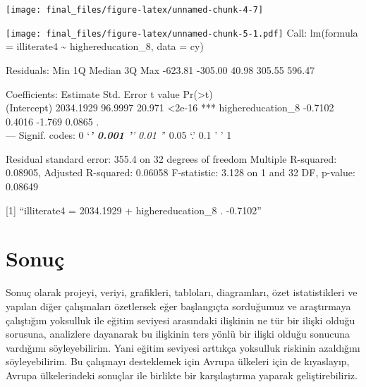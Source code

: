 \documentclass[
  12pt,
]{article}
\begin{document}
\begin{center}\texttt{[image: final\_files/figure-latex/unnamed-chunk-4-7]} \end{center}

\texttt{[image: final\_files/figure-latex/unnamed-chunk-5-1.pdf]}
Call:
lm(formula = illiterate4 \textasciitilde{} highereducation\_8, data = cy)

Residuals:
Min 1Q Median 3Q Max
-623.81 -305.00 40.98 305.55 596.47

Coefficients:
Estimate Std. Error t value Pr(\textgreater\textbar t\textbar)\\
(Intercept) 2034.1929 96.9997 20.971 \textless2e-16 ***
highereducation\_8 -0.7102 0.4016 -1.769 0.0865 .\\
---
Signif. codes: 0 `\emph{\textbf{' 0.001 '}' 0.01 '}' 0.05 `.' 0.1 ' ' 1

Residual standard error: 355.4 on 32 degrees of freedom
Multiple R-squared: 0.08905, Adjusted R-squared: 0.06058
F-statistic: 3.128 on 1 and 32 DF, p-value: 0.08649

{[}1{]} ``illiterate4 = 2034.1929 + highereducation\_8 . -0.7102''

\hypertarget{sonuuxe7}{%
\section{Sonuç}\label{sonuuxe7}}

Sonuç olarak projeyi, veriyi, grafikleri, tabloları, diagramları, özet istatistikleri ve yapılan diğer çalışmaları özetlersek eğer başlangıçta sorduğumuz ve araştırmaya çalıştığım yoksulluk ile eğitim seviyesi arasındaki ilişkinin ne tür bir ilişki olduğu sorusuna, analizlere dayanarak bu ilişkinin ters yönlü bir ilişki olduğu sonucuna vardığımı söyleyebilirim. Yani eğitim seviyesi arttıkça yoksulluk riskinin azaldığını söyleyebilirim. Bu çalışmayı desteklemek için Avrupa ülkeleri için de kıyaslayıp, Avrupa ülkelerindeki sonuçlar ile birlikte bir karşılaştırma yaparak geliştirebiliriz.
\end{document}
